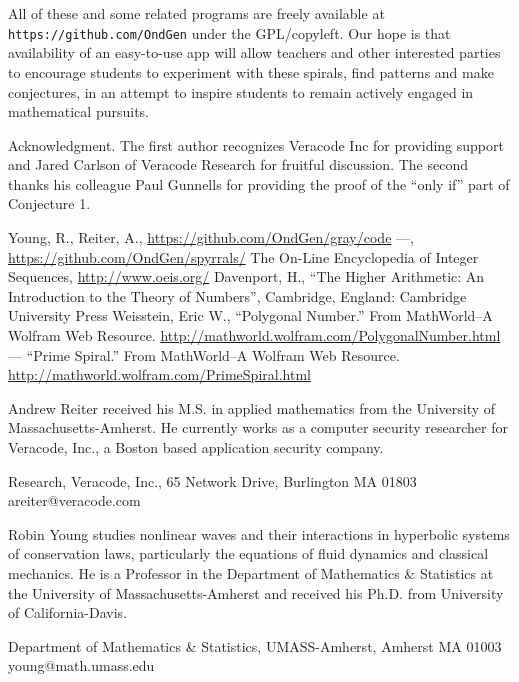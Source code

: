 \documentclass{article}
\theoremstyle{definition}
\begin{document}
All of these and some related programs are freely available at {\tt
  https://github.com/OndGen} under the GPL/copyleft.  Our hope is that
availability of an easy-to-use app will allow teachers and other
interested parties to encourage students to experiment with these
spirals, find patterns and make conjectures, in an attempt to inspire
students to remain actively engaged in mathematical pursuits.



\begin{acknowledgment}{Acknowledgment.}
  The first author recognizes Veracode Inc for providing support and
  Jared Carlson of Veracode Research for fruitful discussion.  The
  second thanks his colleague Paul Gunnells for providing the proof of
  the ``only if'' part of Conjecture 1.
\end{acknowledgment}

\begin{thebibliography}{1}
 Young, R., Reiter, A., \url{https://github.com/OndGen/gray/code}
 ---, \url{https://github.com/OndGen/spyrrals/}
 The On-Line Encyclopedia of Integer Sequences, \url{http://www.oeis.org/}
 Davenport, H., ``The Higher Arithmetic: An Introduction to the Theory of Numbers'', Cambridge, England: Cambridge University Press
 Weisstein, Eric W., ``Polygonal Number.'' From MathWorld--A Wolfram Web Resource. \url{http://mathworld.wolfram.com/PolygonalNumber.html} 
 --- ``Prime Spiral.'' From MathWorld--A Wolfram Web Resource. \url{http://mathworld.wolfram.com/PrimeSpiral.html}
\end{thebibliography}

\begin{biog}
\item[Andrew Reiter]  received his M.S. in
  applied mathematics from the University of Massachusetts-Amherst. He
  currently works as a computer security researcher for Veracode,
  Inc., a Boston based application security company.
\begin{affil}
Research,  Veracode, Inc., 65 Network Drive, Burlington MA 01803\\
areiter@veracode.com
\end{affil}

\item[Robin Young] studies nonlinear waves and their interactions in
  hyperbolic systems of conservation laws, particularly the equations
  of fluid dynamics and classical mechanics.  He is a Professor in the
  Department of Mathematics \& Statistics at the University of
  Massachusetts-Amherst and received his Ph.D. from University of
  California-Davis.
\begin{affil}
Department of Mathematics \& Statistics, UMASS-Amherst, Amherst MA 01003 \\
young@math.umass.edu
\end{affil}
\end{biog}
\vfill\eject
\end{document}
